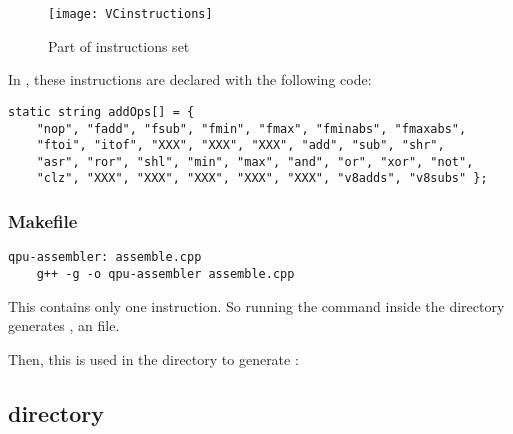 \begin{figure}[!htbp]
	\centering
	\texttt{[image: VCinstructions]}
	\caption{Part of \vc{} instructions set}
	\label{VCinstructionsFigure}
\end{figure}
\FloatBarrier

In , these instructions are declared with the following  code:

\begin{lstlisting}
static string addOps[] = {
    "nop", "fadd", "fsub", "fmin", "fmax", "fminabs", "fmaxabs",
    "ftoi", "itof", "XXX", "XXX", "XXX", "add", "sub", "shr",
    "asr", "ror", "shl", "min", "max", "and", "or", "xor", "not",
    "clz", "XXX", "XXX", "XXX", "XXX", "XXX", "v8adds", "v8subs" };
\end{lstlisting}



\subsubsection{Makefile}

\begin{lstlisting}
qpu-assembler: assemble.cpp
	g++ -g -o qpu-assembler assemble.cpp
\end{lstlisting}

This  contains only one instruction. So running the  command inside the  directory generates , an  file.
\vspace{5 mm}

Then, this  is used in the  directory to generate :

\vspace{5 mm}



\subsection{ directory}


